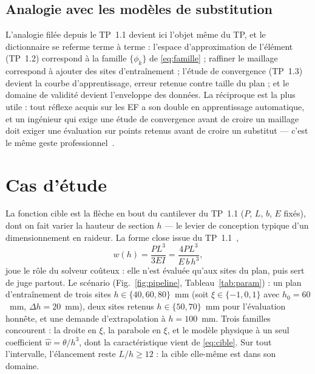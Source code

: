 \documentclass[10pt,journal]{IEEEtran}
\begin{document}
\subsection{Analogie avec les modèles de substitution}
L'analogie filée depuis le TP~1.1 devient ici l'objet même du TP, et le dictionnaire se referme terme à terme : l'espace d'approximation de l'élément (TP~1.2) correspond à la famille $\{\phi_k\}$ de \eqref{eq:famille} ; raffiner le maillage correspond à ajouter des sites d'entraînement ; l'étude de convergence (TP~1.3) devient la courbe d'apprentissage, erreur retenue contre taille du plan ; et le domaine de validité devient l'enveloppe des données. La réciproque est la plus utile : tout réflexe acquis sur les EF a son double en apprentissage automatique, et un ingénieur qui exige une étude de convergence avant de croire un maillage doit exiger une évaluation sur points retenus avant de croire un substitut --- c'est le même geste professionnel~\cite{forrester}.

\section{Cas d'étude}
La fonction cible est la flèche en bout du cantilever du TP~1.1 ($P$, $L$, $b$, $E$ fixés), dont on fait varier la hauteur de section $h$ --- le levier de conception typique d'un dimensionnement en raideur. La forme close issue du TP~1.1~\cite{gere},
\begin{equation}
w(h) = \frac{PL^3}{3EI} = \frac{4PL^3}{E\,b\,h^3},
\label{eq:cible}
\end{equation}
joue le rôle du solveur coûteux : elle n'est évaluée qu'aux sites du plan, puis sert de juge partout. Le scénario (Fig.~\ref{fig:pipeline}, Tableau~\ref{tab:param}) : un plan d'entraînement de trois sites $h\in\{40,60,80\}$~mm (soit $\xi\in\{-1,0,1\}$ avec $h_0=60$~mm, $\Delta h = 20$~mm), deux sites retenus $h\in\{50,70\}$~mm pour l'évaluation honnête, et une demande d'extrapolation à $h=100$~mm. Trois familles concourent : la droite en $\xi$, la parabole en $\xi$, et le modèle \og physique\fg{} à un seul coefficient $\hat w = \theta/h^3$, dont la caractéristique vient de \eqref{eq:cible}. Sur tout l'intervalle, l'élancement reste $L/h \ge 12$ : la cible elle-même est dans son domaine.
\end{document}
